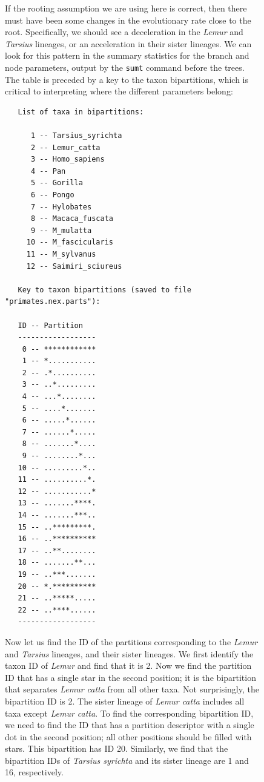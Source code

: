 \documentclass[12pt]{book}
\newcommand{\ttt}[1]{\texttt{#1}}
\begin{document}
\begin{figure}[h]
If the rooting assumption we are using here is correct, then there must have been some changes in
the evolutionary rate close to the root. Specifically, we should see a deceleration in the
\textit{Lemur} and \textit{Tarsius} lineages, or an acceleration in their sister lineages. We can
look for this pattern in the summary statistics for the branch and node parameters, output by the
\ttt{sumt} command before the trees. The table is preceded by a key to the taxon bipartitions,
which is critical to interpreting where the different parameters belong:

\begin{singlespacing}
\footnotesize
\begin{verbatim}
   List of taxa in bipartitions:                                                 
                                                                                   
      1 -- Tarsius_syrichta
      2 -- Lemur_catta
      3 -- Homo_sapiens
      4 -- Pan
      5 -- Gorilla
      6 -- Pongo
      7 -- Hylobates
      8 -- Macaca_fuscata
      9 -- M_mulatta
     10 -- M_fascicularis
     11 -- M_sylvanus
     12 -- Saimiri_sciureus

   Key to taxon bipartitions (saved to file "primates.nex.parts"):

   ID -- Partition
   ------------------
    0 -- ************
    1 -- *...........
    2 -- .*..........
    3 -- ..*.........
    4 -- ...*........
    5 -- ....*.......
    6 -- .....*......
    7 -- ......*.....
    8 -- .......*....
    9 -- ........*...
   10 -- .........*..
   11 -- ..........*.
   12 -- ...........*
   13 -- .......****.
   14 -- .......***..
   15 -- ..*********.
   16 -- ..**********
   17 -- ..**........
   18 -- .......**...
   19 -- ..***.......
   20 -- *.**********
   21 -- ..*****.....
   22 -- ..****......
   ------------------
\end{verbatim}
\end{singlespacing}
\normalsize

Now let us find the ID of the partitions corresponding to the \textit{Lemur} and \textit{Tarsius}
lineages, and their sister lineages. We first identify the taxon ID of \textit{Lemur} and find that
it is 2. Now we find the partition ID that has a single star in the second position; it is the
bipartition that separates \textit{Lemur catta} from all other taxa. Not surprisingly, the
bipartition ID is 2. The sister lineage of \textit{Lemur catta} includes all taxa except
\textit{Lemur catta}. To find the corresponding bipartition ID, we need to find the ID that has a
partition descriptor with a single dot in the second position; all other positions should be filled
with stars. This bipartition has ID 20. Similarly, we find that the bipartition IDs of
\textit{Tarsius syrichta} and its sister lineage are 1 and 16, respectively.


\end{figure}
\end{document}
